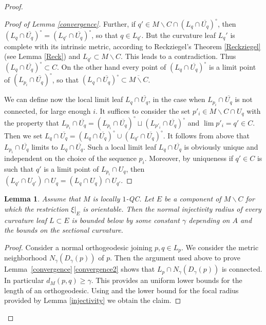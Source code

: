 \documentclass[10pt]{amsart}
\let\moins\smallsetminus
\newtheorem{lemma}[theorem]{Lemma}
\theoremstyle{definition}
\theoremstyle{remark}
\numberwithin{equation}{section}
\begin{document}
\begin{proof}
\begin{proof}[Proof of Lemma \ref{convergence}]
Further, if $q'\in M\moins C \cap (L_q\cap \overline{U_q})^{\circ}$, then $(L_q\cap \overline{U_q})^{\circ}=(L_{q'}\cap \overline{U_q})^{\circ}$, so that
$q\in L_{q'}$. But the curvature leaf $L_q'$ is complete with its intrinsic metric, according to Reckziegel's Theorem \ref{Reckziegel} (see Lemma \ref{Reck}) and $L_{q'}\subset M\moins C$. This leads to a contradiction. Thus $(L_q\cap \overline{U_q})^{\circ}\subset C$. On the other hand every point of $(L_q\cap \overline{U_q})^{\circ}$ is a limit point of $(L_{p_i}\cap \overline{U_q})^{\circ}$, so that $(L_q\cap \overline{U_q})^{\circ}\subset \overline{M\moins C}$.

We can define now the local limit leaf $L_q\cap \overline{U_q}$, in the case when $L_{p_i}\cap \overline{U_q}$ is not connected, for large enough $i$.
It suffices to consider the set $p'_i\in M\moins C\cap U_q$ with the property that
$L_{p_i}\cap \overline{U_q}=(L_{p_i}\cap \overline{U_q})^{\circ} \sqcup (L_{p'_i}\cap \overline{U_q})^{\circ}$ and
$\lim p'_i=q'\in C$. Then we set $L_q\cap \overline{U_q}= (L_q\cap \overline{U_q})^{\circ} \cup (L_{q'}\cap \overline{U_q})^{\circ}$.
It follows from above that $L_{p_i}\cap \overline{U_q}$ limits to $L_q\cap \overline{U_q}$.
Such a local limit leaf $L_q\cap \overline{U_q}$ is obviously unique and independent on the choice of the sequence $p_i$.
Moreover, by uniqueness if $q'\in C$ is such that $q'$ is a limit point of $L_{p_i}\cap U_q$, then
$(L_{q'}\cap U_{q'})\cap U_q=(L_{q}\cap U_q)\cap U_{q'}$.
\end{proof}

\begin{lemma}\label{normalinjectivity}
Assume that $M$ is locally $1$-QC. Let $E$ be a component of $M\moins C$ for which the restriction
$\xi|_{E}$ is orientable. Then the normal injectivity radius of every curvature leaf $L\subset E$ is bounded below
by some constant $\gamma$ depending on $A$ and the bounds on the sectional curvature.
\end{lemma}
\begin{proof}
Consider a normal orthogeodesic joining $p,q\in L_p$. We consider the metric neighborhood $N_{\gamma}(D_\gamma(p))$ of $p$.
Then the argument used above to prove Lemma~\ref{convergence}\,\eqref{convergence2} shows that $L_p\cap N_{\gamma}(D_\gamma(p))$ is connected.
In particular $d_M(p,q) \geq \gamma$. This provides an uniform lower bounds for the length of an orthogeodesic. Using
\cite[Th.\,4.2]{Herm} and the lower bound for the focal radius provided by Lemma \ref{injectivity} we obtain the claim.
\end{proof}


\end{proof}
\end{document}
